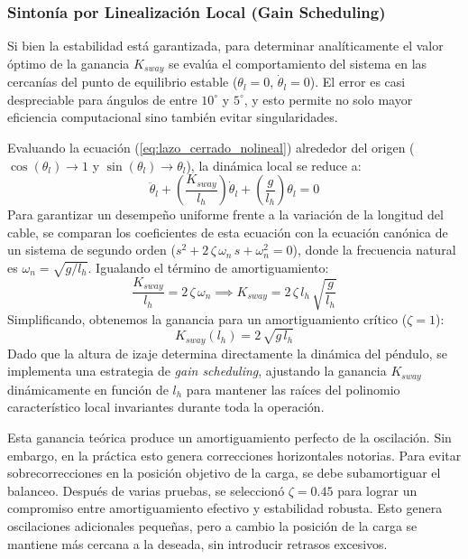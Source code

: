 \documentclass[11pt]{article}                                    %
\begin{document}
\subsubsection{Sintonía por Linealización Local (Gain Scheduling)}
Si bien la estabilidad está garantizada, para determinar analíticamente el valor óptimo de la ganancia $K_{sway}$ se evalúa el comportamiento del sistema en las cercanías del punto de equilibrio estable ($\theta_l = 0$, $\dot{\theta}_l = 0$). El error es casi despreciable para ángulos de entre $10^\circ$ y $5^\circ$, y esto permite no solo mayor eficiencia computacional sino también evitar singularidades.

Evaluando la ecuación (\ref{eq:lazo_cerrado_nolineal}) alrededor del origen ($\cos(\theta_l) \to 1$ y $\sin(\theta_l) \to \theta_l$), la dinámica local se reduce a:
\begin{equation}
    \ddot{\theta}_l + \left( \frac{K_{sway}}{l_h} \right) \dot{\theta}_l + \left( \frac{g}{l_h} \right) \theta_l = 0
\end{equation}
Para garantizar un desempeño uniforme frente a la variación de la longitud del cable, se comparan los coeficientes de esta ecuación con la ecuación canónica de un sistema de segundo orden ($s^2 + 2\,\zeta\,\omega_n \,s + \omega_n^2 = 0$), donde la frecuencia natural es $\omega_n = \sqrt{g/l_h}$. Igualando el término de amortiguamiento:
\begin{equation}
    \frac{K_{sway}}{l_h} = 2 \, \zeta \, \omega_n \implies K_{sway} = 2 \, \zeta \, l_h \, \sqrt{\frac{g}{l_h}}
\end{equation}
Simplificando, obtenemos la ganancia para un amortiguamiento crítico ($\zeta = 1$):
\begin{equation}
    K_{sway}(l_h) = 2 \,\sqrt{g \, l_h}
\end{equation}
Dado que la altura de izaje determina directamente la dinámica del péndulo, se implementa una estrategia de \textit{gain scheduling}, ajustando la ganancia $K_{sway}$ dinámicamente en función de $l_h$ para mantener las raíces del polinomio característico local invariantes durante toda la operación.

Esta ganancia teórica produce un amortiguamiento perfecto de la oscilación. Sin embargo, en la práctica esto genera correcciones horizontales notorias. Para evitar sobrecorrecciones en la posición objetivo de la carga, se debe subamortiguar el balanceo. Después de varias pruebas, se seleccionó $\zeta = 0.45$ para lograr un compromiso entre amortiguamiento efectivo y estabilidad robusta. Esto genera oscilaciones adicionales pequeñas, pero a cambio la posición de la carga se mantiene más cercana a la deseada, sin introducir retrasos excesivos.
\end{document}
